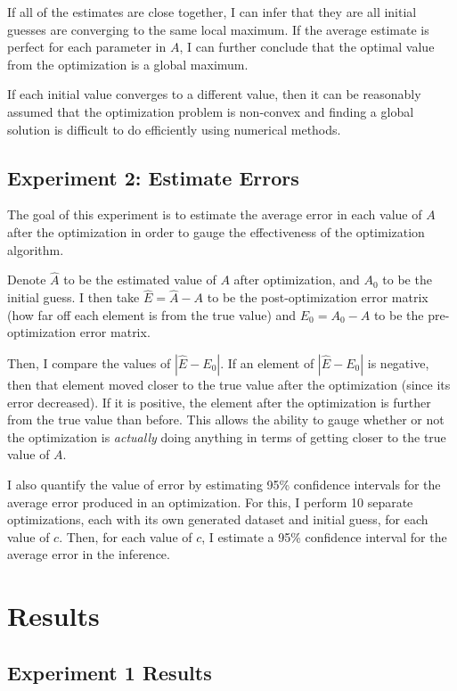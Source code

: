 \documentclass[12pt]{article}
\theoremstyle{definition}
\begin{document}
If all of the estimates are close together, I can infer that they are all initial guesses are converging to the same local maximum. If the average estimate is perfect for each parameter in $A$, I can further conclude that the optimal value from the optimization is a global maximum.

If each initial value converges to a different value, then it can be reasonably assumed that the optimization problem is non-convex and finding a global solution is difficult to do efficiently using numerical methods.

\subsection{Experiment 2: Estimate Errors}

The goal of this experiment is to estimate the average error in each value of $A$ after the optimization in order to gauge the effectiveness of the optimization algorithm. 

Denote $\hat{A}$ to be the estimated value of $A$ after optimization, and $A_0$ to be the initial guess. I then take $\hat{E} = \hat{A} - A$ to be the post-optimization error matrix (how far off each element is from the true value) and $E_0 = A_0 - A$ to be the pre-optimization error matrix. 

Then, I compare the values of $|\hat{E} - E_0|$. If an element of $|\hat{E} - E_0|$ is negative, then that element moved closer to the true value after the optimization (since its error decreased). If it is positive, the element after the optimization is further from the true value than before. This allows the ability to gauge whether or not the optimization is \textit{actually} doing anything in terms of getting closer to the true value of $A$.

I also quantify the value of error by estimating 95\% confidence intervals for the average error produced in an optimization. For this, I perform 10 separate optimizations, each with its own generated dataset and initial guess, for each value of $c$. Then, for each value of $c$, I estimate a 95\% confidence interval for the average error in the inference.



\section{Results}
\label{sec:results}

\subsection{Experiment 1 Results}
\label{subsec:Exper1Results}
\end{document}
